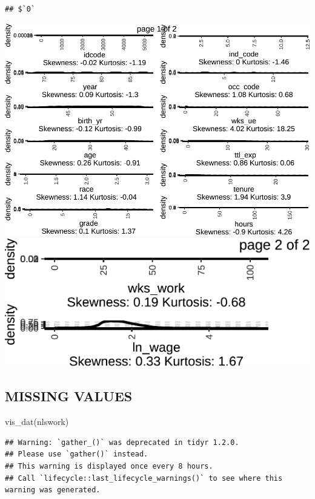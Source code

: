 \documentclass[
]{article}
\newenvironment{Shaded}{\begin{snugshade}}{\end{snugshade}}
\newcommand{\FunctionTok}[1]{\textcolor[rgb]{0.00,0.00,0.00}{#1}}
\newcommand{\NormalTok}[1]{#1}
\begin{document}
\begin{verbatim}
## $`0`
\end{verbatim}

\includegraphics{notebook_panel_data_files/figure-latex/Exploratory data analysis-9.pdf}
\includegraphics{notebook_panel_data_files/figure-latex/Exploratory data analysis-10.pdf}

\hypertarget{missing-values}{%
\subsection{MISSING VALUES}\label{missing-values}}

\begin{Shaded}
\begin{Highlighting}[]
  \FunctionTok{vis\_dat}\NormalTok{(nlswork)}
\end{Highlighting}
\end{Shaded}

\begin{verbatim}
## Warning: `gather_()` was deprecated in tidyr 1.2.0.
## Please use `gather()` instead.
## This warning is displayed once every 8 hours.
## Call `lifecycle::last_lifecycle_warnings()` to see where this warning was generated.
\end{verbatim}
\end{document}
